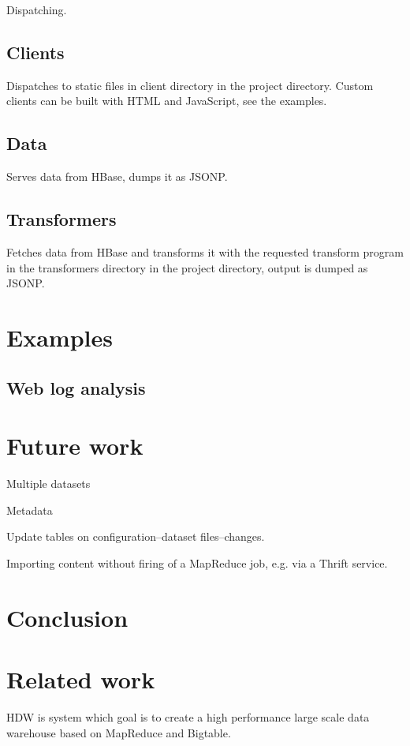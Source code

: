 \documentclass[a4paper,10pt]{book}
\begin{document}
Dispatching.



\section{Clients}

Dispatches to static files in client directory in the project directory.
Custom clients can be built with HTML and JavaScript, see the examples.



\section{Data}

Serves data from HBase, dumps it as JSONP.



\section{Transformers}

Fetches data from HBase and transforms it with the requested transform
program in the transformers directory in the project directory, output is
dumped as JSONP.



\chapter{Examples}

\section{Web log analysis}



\chapter{Future work}

Multiple datasets

Metadata

Update tables on configuration--dataset files--changes.

Importing content without firing of a MapReduce job, e.g. via a Thrift
service.



\chapter{Conclusion}



\chapter{Related work}

HDW is system which goal is to create a high performance large scale data
warehouse based on MapReduce and Bigtable. \cite{hdw}



\pagebreak



 
\end{document}
